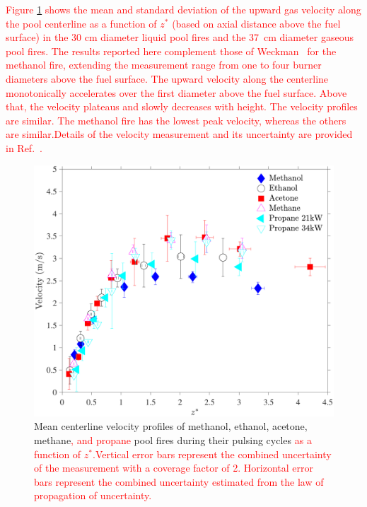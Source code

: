 \documentclass[12pt]{article}
\begin{document}
\textcolor{red}{Figure \ref{fig:Vel_Comparison} shows the mean and standard deviation of the upward gas velocity along the pool centerline as a function of $z^*$ (based on axial distance above the fuel surface) in the 30 cm diameter liquid pool fires and the 37~cm diameter gaseous pool fires. The results reported here complement those of Weckman~\cite{Weckman1996} for the methanol fire, extending the measurement range from one to four burner diameters above the fuel surface. The upward velocity along the centerline monotonically accelerates over the first diameter above the fuel surface. Above that, the velocity plateaus and slowly decreases with height. The velocity profiles are similar. The methanol fire has the lowest peak velocity, whereas the others are similar.Details of the velocity measurement and its uncertainty are provided in Ref.~\cite{Sung2021}.}


\begin{figure}[h!]
	\centering
\includegraphics[width=10.0 cm, keepaspectratio]{Velocity_Comparison.pdf}
	\caption[Mean centerline velocity profiles]{Mean centerline velocity profiles of methanol, ethanol, acetone, methane\textcolor{red}{, and propane} pool fires during their pulsing cycles \textcolor{red}{ as a function of $z^*$.Vertical error bars represent the combined uncertainty of the measurement with a coverage factor of 2. Horizontal error bars represent the combined uncertainty estimated from the law of propagation of uncertainty.}}
	\label{fig:Vel_Comparison}
\end{figure}
\end{document}
